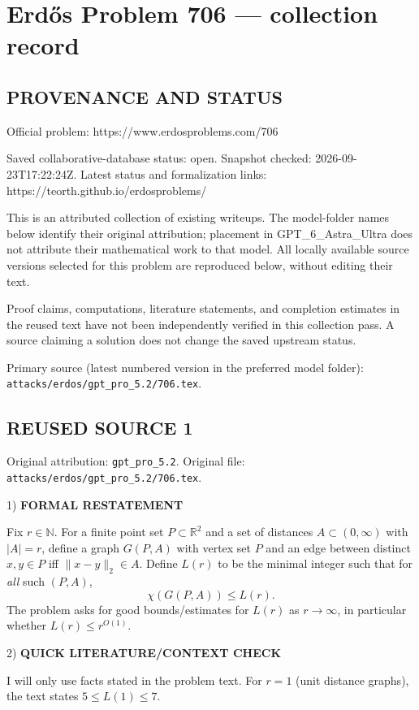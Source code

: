 \section*{Erd\H{o}s Problem 706 --- collection record}

\subsection*{PROVENANCE AND STATUS}
Official problem: https://www.erdosproblems.com/706

Saved collaborative-database status: open.
Snapshot checked: 2026-09-23T17:22:24Z.
Latest status and formalization links: https://teorth.github.io/erdosproblems/

This is an attributed collection of existing writeups. The model-folder names below identify their original attribution; placement in GPT\_6\_Astra\_Ultra does not attribute their mathematical work to that model. All locally available source versions selected for this problem are reproduced below, without editing their text.

Proof claims, computations, literature statements, and completion estimates in the reused text have not been independently verified in this collection pass. A source claiming a solution does not change the saved upstream status.

Primary source (latest numbered version in the preferred model folder): \texttt{attacks/erdos/gpt\_pro\_5.2/706.tex}.

\subsection*{REUSED SOURCE 1}
Original attribution: \texttt{gpt\_pro\_5.2}.
Original file: \texttt{attacks/erdos/gpt\_pro\_5.2/706.tex}.


1) \textbf{FORMAL RESTATEMENT}

Fix $r\in\mathbb{N}$.
For a finite point set $P\subset\mathbb{R}^2$ and a set of distances $A\subset(0,\infty)$ with $|A|=r$, define a graph $G(P,A)$ with vertex set $P$ and an edge between distinct $x,y\in P$ iff $\|x-y\|_2\in A$.
Define $L(r)$ to be the minimal integer such that for \emph{all} such $(P,A)$,
\[
\chi(G(P,A))\le L(r).
\]
The problem asks for good bounds/estimates for $L(r)$ as $r\to\infty$, in particular whether $L(r)\le r^{O(1)}$.

2) \textbf{QUICK LITERATURE/CONTEXT CHECK}

I will only use facts stated in the problem text.
For $r=1$ (unit distance graphs), the text states $5\le L(1)\le 7$.

